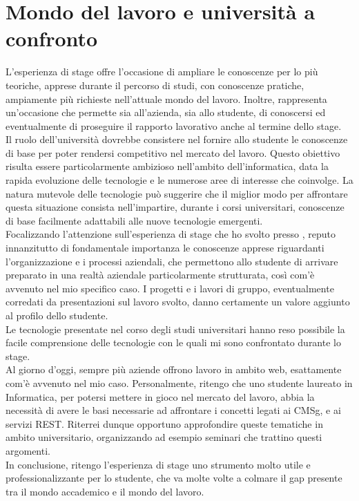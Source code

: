\section{Mondo del lavoro e università a confronto}
L'esperienza di stage offre l'occasione di ampliare le conoscenze per lo più teoriche, apprese durante il percorso di studi, con conoscenze pratiche, ampiamente più richieste nell'attuale mondo del lavoro. Inoltre, rappresenta un'occasione che permette sia all'azienda, sia allo studente, di conoscersi  ed eventualmente di proseguire il rapporto lavorativo anche al termine dello stage. \\
Il ruolo dell'università dovrebbe consistere nel fornire allo studente le conoscenze di base per poter rendersi competitivo nel mercato del lavoro. Questo obiettivo risulta essere particolarmente ambizioso nell'ambito dell'informatica, data la rapida evoluzione delle tecnologie e le numerose aree di interesse che coinvolge. La natura mutevole delle tecnologie può suggerire che il miglior modo per affrontare questa situazione consista nell'impartire, durante i corsi universitari, conoscenze di base facilmente adattabili alle nuove tecnologie emergenti. \\
Focalizzando l'attenzione sull'esperienza di stage che ho svolto presso \nomeAzienda, reputo innanzitutto di fondamentale importanza le conoscenze apprese riguardanti l'organizzazione e i processi aziendali, che permettono allo studente di arrivare preparato in una realtà aziendale particolarmente strutturata, così com'è avvenuto nel mio specifico caso. I progetti e i lavori di gruppo, eventualmente corredati da presentazioni sul lavoro svolto, danno certamente un valore aggiunto al profilo dello studente. \\
Le tecnologie presentate nel corso degli studi universitari hanno reso possibile la facile comprensione delle tecnologie con le quali mi sono confrontato durante lo stage. \\
Al giorno d'oggi, sempre più aziende offrono lavoro in ambito web, esattamente com'è avvenuto nel mio caso. Personalmente, ritengo che uno studente laureato in Informatica, per potersi mettere in gioco nel mercato del lavoro, abbia la necessità di avere le basi necessarie ad affrontare i concetti legati ai \gls{CMSg}, e ai servizi \gls{REST}. Riterrei dunque opportuno approfondire queste tematiche in ambito universitario, organizzando ad esempio seminari che trattino questi argomenti. \\
In conclusione, ritengo l'esperienza di stage uno strumento molto utile e professionalizzante per lo studente, che va molte volte a colmare il gap presente tra il mondo accademico e il mondo del lavoro.